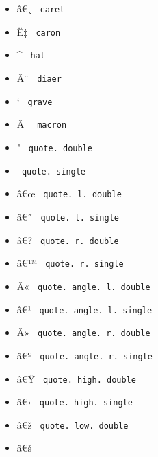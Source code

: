 \begin{itemize}
\item
  \label{symbol-caret}{{ â€¸ } \texttt{\ caret\ }}
\item
  \label{symbol-caron}{{ Ë‡ } \texttt{\ caron\ }}
\item
  \label{symbol-hat}{{ \^{} } \texttt{\ hat\ }}
\item
  \label{symbol-diaer}{{ Â¨ } \texttt{\ diaer\ }}
\item
  \label{symbol-grave}{{ ` } \texttt{\ grave\ }}
\item
  \label{symbol-macron}{{ Â¯ } \texttt{\ macron\ }}
\item
  \label{symbol-quote.double}{{ " }
  \texttt{\ quote.\ double\ }}
\item
  \label{symbol-quote.single}{{ \textquotesingle{} }
  \texttt{\ quote.\ single\ }}
\item
  \label{symbol-quote.l.double}{{ â€œ }
  \texttt{\ quote.\ l.\ double\ }}
\item
  \label{symbol-quote.l.single}{{ â€˜ }
  \texttt{\ quote.\ l.\ single\ }}
\item
  \label{symbol-quote.r.double}{{ â€? }
  \texttt{\ quote.\ r.\ double\ }}
\item
  \label{symbol-quote.r.single}{{ â€™ }
  \texttt{\ quote.\ r.\ single\ }}
\item
  \label{symbol-quote.angle.l.double}{{ Â« }
  \texttt{\ quote.\ angle.\ l.\ double\ }}
\item
  \label{symbol-quote.angle.l.single}{{ â€¹ }
  \texttt{\ quote.\ angle.\ l.\ single\ }}
\item
  \label{symbol-quote.angle.r.double}{{ Â» }
  \texttt{\ quote.\ angle.\ r.\ double\ }}
\item
  \label{symbol-quote.angle.r.single}{{ â€º }
  \texttt{\ quote.\ angle.\ r.\ single\ }}
\item
  \label{symbol-quote.high.double}{{ â€Ÿ }
  \texttt{\ quote.\ high.\ double\ }}
\item
  \label{symbol-quote.high.single}{{ â€› }
  \texttt{\ quote.\ high.\ single\ }}
\item
  \label{symbol-quote.low.double}{{ â€ž }
  \texttt{\ quote.\ low.\ double\ }}
\item
  \label{symbol-quote.low.single}{{ â€š }
}
\end{itemize}

